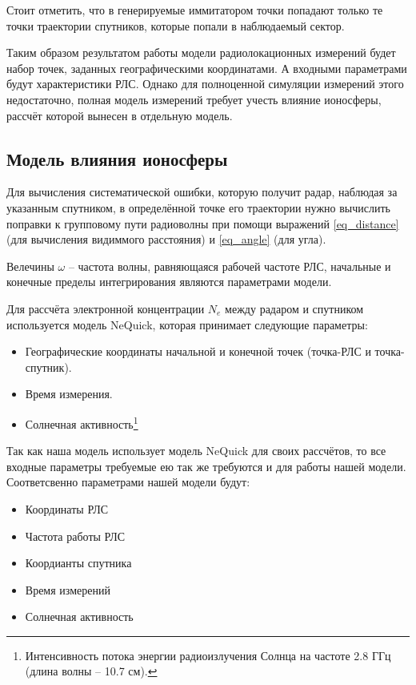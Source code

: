 Стоит отметить, что в генерируемые иммитатором точки попадают только те точки траектории спутников, которые попали 
в наблюдаемый сектор.

Таким образом результатом работы модели радиолокационных измерений будет набор точек, заданных 
географическими координатами. А входными параметрами будут характеристики РЛС. Однако для полноценной симуляции 
измерений этого недостаточно, полная модель измерений требует учесть влияние ионосферы, рассчёт которой вынесен 
в отдельную модель.

\subsection{Модель влияния ионосферы}

Для вычисления систематической ошибки, которую получит радар, наблюдая за указанным спутником, в определённой точке
его траектории нужно вычислить поправки к групповому пути радиоволны при помощи выражений \ref{eq_distance} (для
вычисления видиммого расстояния) и \ref{eq_angle} (для угла).

Велечины $\omega$ -- частота волны, равняющаяся рабочей частоте РЛС, начальные и конечные пределы интегрирования
являются параметрами модели.

Для рассчёта электронной концентрации $N_e$ между радаром и спутником используется модель NeQuick\cite{NeQuick},
которая принимает следующие параметры:
\begin{itemize}
	\item Географические координаты начальной и конечной точек (точка-РЛС и точка-спутник).
	\item Время измерения.
	\item Солнечная активность\footnote{Интенсивность потока энергии радиоизлучения Солнца на частоте 2.8 ГГц
			(длина волны – 10.7 см).}
\end{itemize}

Так как наша модель использует модель NeQuick для своих рассчётов, то все входные параметры требуемые ею так же
требуются и для работы нашей модели. Соответсвенно параметрами нашей модели будут:
\begin{itemize}
	\item Координаты РЛС
	\item Частота работы РЛС
	\item Коордианты спутника
	\item Время измерений
	\item Солнечная активность
\end{itemize}


